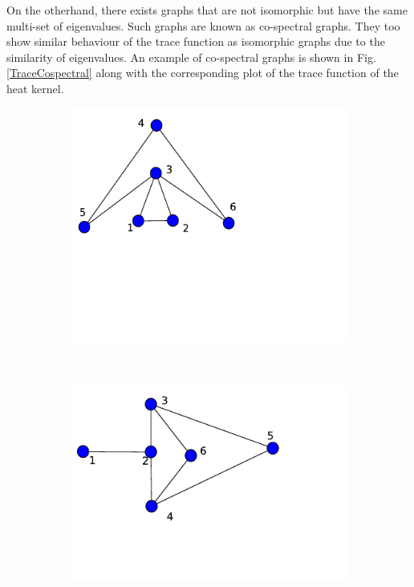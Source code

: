 \documentclass[10pt,a4paper]{article}
\theoremstyle{plain}
\theoremstyle{definition}
\begin{document}
        On the otherhand, there exists graphs that are not isomorphic but have the same multi-set of eigenvalues. Such graphs are known as co-spectral graphs. They too show similar behaviour of the trace function as isomorphic graphs due to the similarity of eigenvalues. An example of co-spectral graphs is shown in Fig.\ref{TraceCospectral} along with the corresponding plot of the trace function of the heat kernel.
        \begin{figure}[H]
        	\centering
        	\begin{subfigure}[b]{0.30\textwidth}
        		\includegraphics[width= \textwidth]{images/graph-cospectral1.pdf}
        		\caption{}
        		\label{cospectralgraph1}
        	\end{subfigure}~
        	\begin{subfigure}[b]{0.30\textwidth}
        		\includegraphics[width= \textwidth]{images/graph-cospectral2.pdf}

\end{subfigure}
\end{figure}
\end{document}
